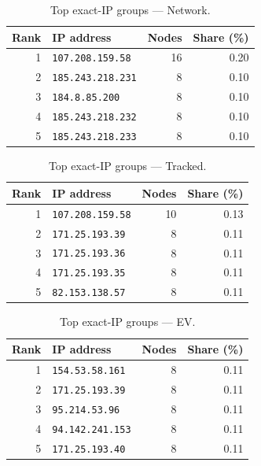 \documentclass[conference]{IEEEtran}
\begin{document}
\begin{table}[H]
\caption{Top exact-IP groups --- Network.}
\begin{center}\small
\begin{tabular}{|r|l|r|r|}
\hline
\textbf{Rank} & \textbf{IP address} & \textbf{Nodes} & \textbf{Share (\%)} \\ \hline
1 & \texttt{107.208.159.58} & 16 & 0.20 \\ \hline
2 & \texttt{185.243.218.231} & 8 & 0.10 \\ \hline
3 & \texttt{184.8.85.200} & 8 & 0.10 \\ \hline
4 & \texttt{185.243.218.232} & 8 & 0.10 \\ \hline
5 & \texttt{185.243.218.233} & 8 & 0.10 \\ \hline
\end{tabular}
\label{tab:ip_count_network}
\end{center}\end{table}
 
\begin{table}[H]
\caption{Top exact-IP groups --- Tracked.}
\begin{center}\small
\begin{tabular}{|r|l|r|r|}
\hline
\textbf{Rank} & \textbf{IP address} & \textbf{Nodes} & \textbf{Share (\%)} \\ \hline
1 & \texttt{107.208.159.58} & 10 & 0.13 \\ \hline
2 & \texttt{171.25.193.39} & 8 & 0.11 \\ \hline
3 & \texttt{171.25.193.36} & 8 & 0.11 \\ \hline
4 & \texttt{171.25.193.35} & 8 & 0.11 \\ \hline
5 & \texttt{82.153.138.57} & 8 & 0.11 \\ \hline
\end{tabular}
\label{tab:ip_count_tracked}
\end{center}\end{table}
 
\begin{table}[H]
\caption{Top exact-IP groups --- EV.}
\begin{center}\small
\begin{tabular}{|r|l|r|r|}
\hline
\textbf{Rank} & \textbf{IP address} & \textbf{Nodes} & \textbf{Share (\%)} \\ \hline
1 & \texttt{154.53.58.161} & 8 & 0.11 \\ \hline
2 & \texttt{171.25.193.39} & 8 & 0.11 \\ \hline
3 & \texttt{95.214.53.96} & 8 & 0.11 \\ \hline
4 & \texttt{94.142.241.153} & 8 & 0.11 \\ \hline
5 & \texttt{171.25.193.40} & 8 & 0.11 \\ \hline
\end{tabular}
\label{tab:ip_count_ephemeral_variable}
\end{center}\end{table}
 
\end{document}
